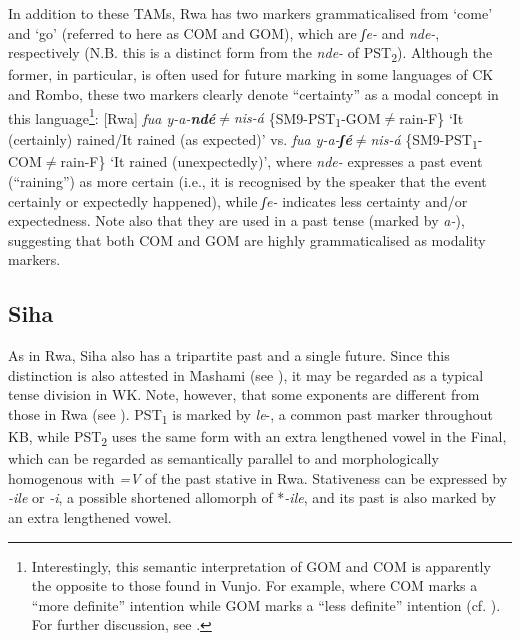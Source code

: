\documentclass[output=paper]{langscibook}
\begin{document}
In addition to these TAMs, Rwa has two markers grammaticalised from ‘come’ and ‘go’ (referred to here as COM and GOM), which are \textit{ʃe-} and \textit{nde-}, respectively (N.B. this is a distinct form from the \textit{nde-} of PST\textsubscript{2}). Although the former, in particular, is often used for future marking in some languages of CK and Rombo, these two markers clearly denote “certainty” as a modal concept in this language\footnote{Interestingly, this semantic interpretation of GOM and COM is apparently the opposite to those found in Vunjo. For example, where COM marks a “more definite” intention while GOM marks a “less definite” intention (cf. \citealt[87]{Nurse2003a}). For further discussion, see \citet{ShinagawaForthcoming-a}.}: [Rwa] \textit{fua y-a-}\textbf{\textit{ndé}}\textit{${\neq}$nis-á} \{SM9-PST\textsubscript{1}{}-GOM${\neq}$rain-F\} `It (certainly) rained/It rained (as expected)' vs. \textit{fua y-a-}\textbf{\textit{ʃé}}\textit{${\neq}$nis-á} \{SM9-PST\textsubscript{1}{}-COM${\neq}$rain-F\} `It rained (unexpectedly)', where \textit{nde-} expresses a past event (“raining”) as more certain (i.e., it is recognised by the speaker that the event certainly or expectedly happened), while \textit{ʃe-} indicates less certainty and/or expectedness. Note also that they are used in a past tense (marked by \textit{a-}), suggesting that both COM and GOM are highly grammaticalised as modality markers.


\subsection{Siha}\label{sec:shinagawa:2.2}

As in Rwa, Siha also has a tripartite past and a single future. Since this distinction is also attested in Mashami (see ), it may be regarded as a typical tense division in WK. Note, however, that some exponents are different from those in Rwa (see ). PST\textsubscript{1} is marked by \textit{le}{}-, a common past marker throughout KB, while PST\textsubscript{2} uses the same form with an extra lengthened vowel in the Final, which can be regarded as semantically parallel to and morphologically homogenous with \textit{=V} of the past stative in Rwa. Stativeness can be expressed by \textit{{}-ile} or \textit{{}-i}, a possible shortened allomorph of *\textit{{}-ile}, and its past is also marked by an extra lengthened vowel.
\end{document}
